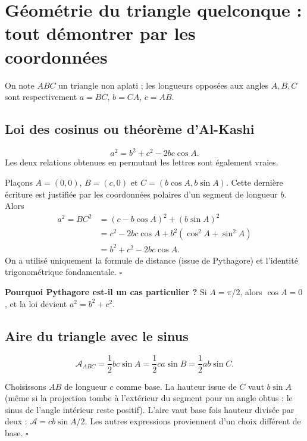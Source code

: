 \documentclass[../cours_spe_trigo.tex]{subfiles}
\begin{document}
\setcounter{chapter}{11}
\chapter{Géométrie du triangle quelconque : tout démontrer par les coordonnées}
On note $ABC$ un triangle non aplati ; les longueurs opposées aux angles $A,B,C$ sont respectivement $a=BC$, $b=CA$, $c=AB$.
\section{Loi des cosinus ou théorème d'Al-Kashi}
\begin{propriete}
\[\boxed{a^2=b^2+c^2-2bc\cos A.}\]
Les deux relations obtenues en permutant les lettres sont également vraies.
\end{propriete}
\begin{demonstration}
Plaçons $A=(0,0)$, $B=(c,0)$ et $C=(b\cos A,b\sin A)$. Cette dernière écriture est justifiée par les coordonnées polaires d'un segment de longueur $b$. Alors
\[
\begin{aligned}
a^2=BC^2&=(c-b\cos A)^2+(b\sin A)^2\\
&=c^2-2bc\cos A+b^2(\cos^2A+\sin^2A)\\
&=\boxed{b^2+c^2-2bc\cos A}.
\end{aligned}
\]
On a utilisé uniquement la formule de distance (issue de Pythagore) et l'identité trigonométrique fondamentale. $\square$
\end{demonstration}
\textbf{Pourquoi Pythagore est-il un cas particulier ?} Si $A=\pi/2$, alors $\cos A=0$, et la loi devient $a^2=b^2+c^2$.
\section{Aire du triangle avec le sinus}
\begin{propriete}
\[\boxed{\mathcal A_{ABC}=\frac12bc\sin A
=\frac12ca\sin B=\frac12ab\sin C.}\]
\end{propriete}
\begin{demonstration}
Choisissons $AB$ de longueur $c$ comme base. La hauteur issue de $C$ vaut $b\sin A$ (même si la projection tombe à l'extérieur du segment pour un angle obtus : le sinus de l'angle intérieur reste positif). L'aire vaut base fois hauteur divisée par deux : $\mathcal A=cb\sin A/2$. Les autres expressions proviennent d'un choix différent de base. $\square$
\end{demonstration}
\end{document}
